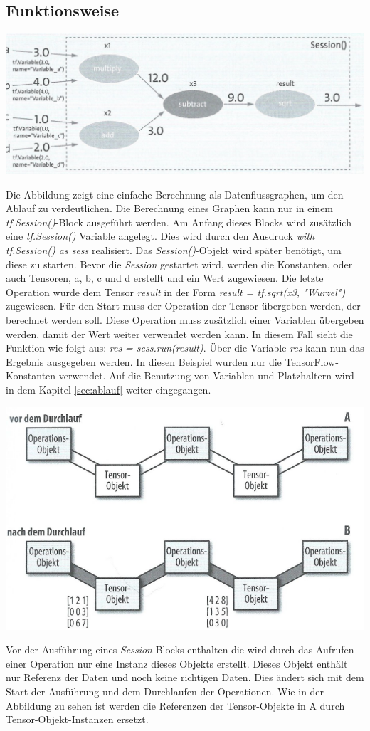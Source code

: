 \subsection{Funktionsweise}
\label{sec:graphenFunktionsweise}
\begin{center}
\includegraphics[width=.6\textwidth]{../abbildungen/5-11.pdf}
	\label{fig:beispielGraph}
\end{center}
Die Abbildung zeigt eine einfache Berechnung als Datenflussgraphen, um den Ablauf zu verdeutlichen. Die Berechnung eines Graphen kann nur in einem \textit{tf.Session()}-Block ausgeführt werden. Am Anfang dieses Blocks wird zusätzlich eine \textit{tf.Session()} Variable angelegt. Dies wird durch den Ausdruck \textit{with tf.Session() as sess} realisiert. Das \textit{Session()}-Objekt wird später benötigt, um diese zu starten. Bevor die \textit{Session} gestartet wird, werden die Konstanten, oder auch Tensoren, a, b, c und d erstellt und ein Wert zugewiesen. Die letzte Operation wurde dem Tensor \textit{result} in der Form \textit{result = tf.sqrt(x3, "Wurzel")} zugewiesen. Für den Start muss der Operation der Tensor übergeben werden, der berechnet werden soll. Diese Operation muss zusätzlich einer Variablen übergeben werden, damit der Wert weiter verwendet werden kann. In diesem Fall sieht die Funktion wie folgt aus: \textit{res = sess.run(result)}. Über die Variable \textit{res} kann nun das Ergebnis ausgegeben werden. In diesen Beispiel wurden nur die TensorFlow-Konstanten verwendet. Auf die Benutzung von Variablen und Platzhaltern wird in dem Kapitel \ref{sec:ablauf} weiter eingegangen.

\begin{center}
\includegraphics[width=.6\textwidth]{../abbildungen/3-4.pdf}
	\label{fig:vorUndNachSession}
\end{center}
Vor der Ausführung eines \textit{Session}-Blocks enthalten die wird durch das Aufrufen einer Operation nur eine Instanz dieses Objekts erstellt. Dieses Objekt enthält nur Referenz der Daten und noch keine richtigen Daten. Dies ändert sich mit dem Start der Ausführung und dem Durchlaufen der Operationen. Wie in der Abbildung zu sehen ist werden die Referenzen der Tensor-Objekte in A durch Tensor-Objekt-Instanzen ersetzt.

